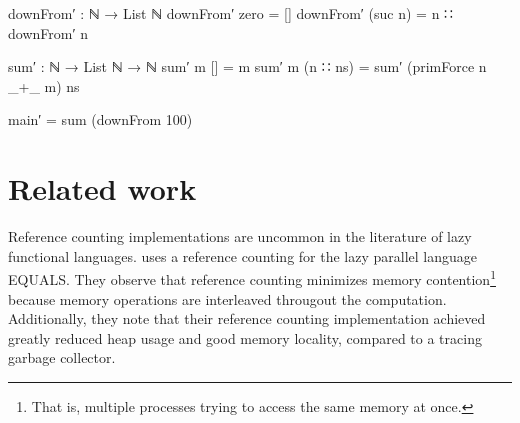 \documentclass[9pt, twocolumn]{article}
\begin{document}
\begin{code}[number]
downFrom′ : ℕ → List ℕ
downFrom′ zero = []
downFrom′ (suc n) = n ∷ downFrom′ n 

sum′ : ℕ → List ℕ → ℕ
sum′ m [] = m
sum′ m (n ∷ ns) = 
  sum′ (primForce n _+_ m) ns

main′ = sum (downFrom 100) 
\end{code}







\section{Related work}
Reference counting implementations are uncommon in the literature of lazy functional languages.
\citet{kaser1992} uses a reference counting for the lazy parallel language EQUALS. They observe that reference counting minimizes memory contention\footnote{That is, multiple processes trying to access the same memory at once.} because memory operations are interleaved througout the computation.
Additionally, they note that their reference counting implementation achieved greatly reduced heap usage and good memory locality, compared to a tracing garbage collector.
\end{document}
